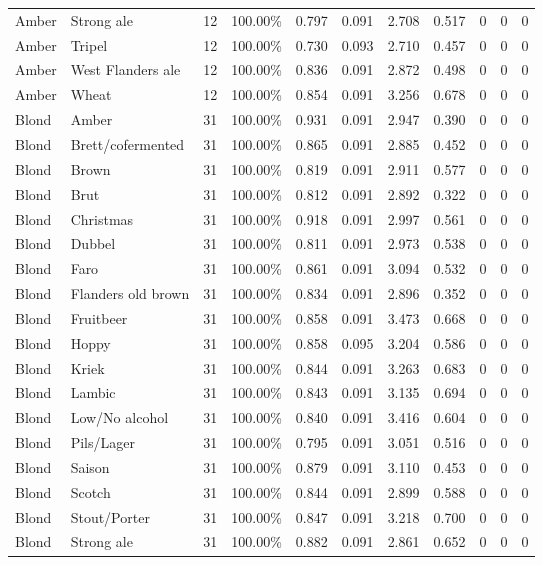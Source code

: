 {\begin{longtable}{llrrrrrrrrr}
Amber & Strong ale & 12 & 100.00\% & 0.797 & 0.091 & 2.708 & 0.517 & 0 & 0 & 0 \\
Amber & Tripel & 12 & 100.00\% & 0.730 & 0.093 & 2.710 & 0.457 & 0 & 0 & 0 \\
Amber & West Flanders ale & 12 & 100.00\% & 0.836 & 0.091 & 2.872 & 0.498 & 0 & 0 & 0 \\
Amber & Wheat & 12 & 100.00\% & 0.854 & 0.091 & 3.256 & 0.678 & 0 & 0 & 0 \\
Blond & Amber & 31 & 100.00\% & 0.931 & 0.091 & 2.947 & 0.390 & 0 & 0 & 0 \\
Blond & Brett/cofermented & 31 & 100.00\% & 0.865 & 0.091 & 2.885 & 0.452 & 0 & 0 & 0 \\
Blond & Brown & 31 & 100.00\% & 0.819 & 0.091 & 2.911 & 0.577 & 0 & 0 & 0 \\
Blond & Brut & 31 & 100.00\% & 0.812 & 0.091 & 2.892 & 0.322 & 0 & 0 & 0 \\
Blond & Christmas & 31 & 100.00\% & 0.918 & 0.091 & 2.997 & 0.561 & 0 & 0 & 0 \\
Blond & Dubbel & 31 & 100.00\% & 0.811 & 0.091 & 2.973 & 0.538 & 0 & 0 & 0 \\
Blond & Faro & 31 & 100.00\% & 0.861 & 0.091 & 3.094 & 0.532 & 0 & 0 & 0 \\
Blond & Flanders old brown & 31 & 100.00\% & 0.834 & 0.091 & 2.896 & 0.352 & 0 & 0 & 0 \\
Blond & Fruitbeer & 31 & 100.00\% & 0.858 & 0.091 & 3.473 & 0.668 & 0 & 0 & 0 \\
Blond & Hoppy & 31 & 100.00\% & 0.858 & 0.095 & 3.204 & 0.586 & 0 & 0 & 0 \\
Blond & Kriek & 31 & 100.00\% & 0.844 & 0.091 & 3.263 & 0.683 & 0 & 0 & 0 \\
Blond & Lambic & 31 & 100.00\% & 0.843 & 0.091 & 3.135 & 0.694 & 0 & 0 & 0 \\
Blond & Low/No alcohol & 31 & 100.00\% & 0.840 & 0.091 & 3.416 & 0.604 & 0 & 0 & 0 \\
Blond & Pils/Lager & 31 & 100.00\% & 0.795 & 0.091 & 3.051 & 0.516 & 0 & 0 & 0 \\
Blond & Saison & 31 & 100.00\% & 0.879 & 0.091 & 3.110 & 0.453 & 0 & 0 & 0 \\
Blond & Scotch & 31 & 100.00\% & 0.844 & 0.091 & 2.899 & 0.588 & 0 & 0 & 0 \\
Blond & Stout/Porter & 31 & 100.00\% & 0.847 & 0.091 & 3.218 & 0.700 & 0 & 0 & 0 \\
Blond & Strong ale & 31 & 100.00\% & 0.882 & 0.091 & 2.861 & 0.652 & 0 & 0 & 0 \\

\end{longtable}}
